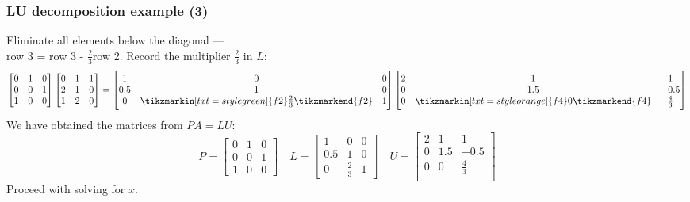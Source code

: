 \begin{frame}[fragile]
  \frametitle{LU decomposition example (3)}
    Eliminate all elements below the diagonal ---\\
    row 3 = row 3 - $\frac{2}{3}$row 2. Record the multiplier $\frac{2}{3}$ in $L$:
  \[
    \begin{bmatrix}
      0 & 1 & 0\\
      0 & 0 & 1 \\
      1 & 0 & 0
    \end{bmatrix} 
    \begin{bmatrix}
      0 & 1 & 1\\
      2 & 1 & 0\\
      1 & 2 & 0
      \end{bmatrix}= 
      \begin{bmatrix}
      1 & 0 & 0\\
      0.5 & 1 & 0\\
      0 & \tikzmarkin[txt=style green]{f2}\frac{2}{3}\tikzmarkend{f2} & 1
      \end{bmatrix}
      \begin{bmatrix}
      2 & 1 & 1\\
      0 & 1.5 & -0.5 \\
      0 & \tikzmarkin[txt=style orange]{f4}0\tikzmarkend{f4} & \frac{4}{3}\\
      \end{bmatrix}
  \]
  \pause
  We have obtained the matrices from $PA=LU$:
  \[
    P = \begin{bmatrix}
      0 & 1 & 0\\
      0 & 0 & 1 \\
      1 & 0 & 0
    \end{bmatrix} \quad
    L=\begin{bmatrix}
      1 & 0 & 0\\
      0.5 & 1 & 0\\
      0 & \frac{2}{3} & 1
      \end{bmatrix} \quad
      U = \begin{bmatrix}
      2 & 1 & 1\\
      0 & 1.5 & -0.5 \\
      0 & 0 & \frac{4}{3}\\
      \end{bmatrix}
  \]
  Proceed with solving for $x$.
\end{frame}

